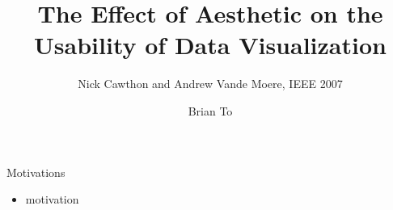 \documentclass[12pt]{beamer}
\title{The Effect of Aesthetic on the Usability of Data Visualization}
\subtitle{Nick Cawthon and Andrew Vande Moere, IEEE 2007}
\author{Brian To}
\begin{document}
  \maketitle

  \begin{frame}{Motivations}
    \begin{itemize}
      \item motivation
    \end{itemize}
  \end{frame}
\end{document}

